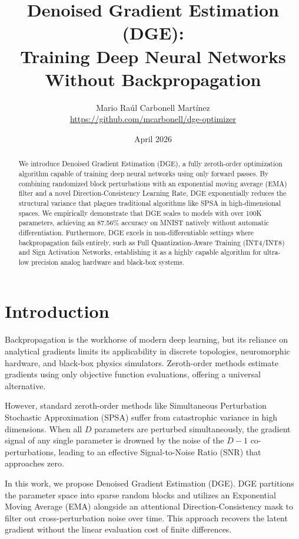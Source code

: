 \documentclass[11pt, a4paper]{article}
\title{Denoised Gradient Estimation (DGE): \\ 
Training Deep Neural Networks Without Backpropagation}
\author{Mario Raúl Carbonell Martínez \\ \url{https://github.com/mcarbonell/dge-optimizer}}
\date{April 2026}
\begin{document}
\maketitle

\begin{abstract}
We introduce Denoised Gradient Estimation (DGE), a fully zeroth-order optimization algorithm capable of training deep neural networks using only forward passes. By combining randomized block perturbations with an exponential moving average (EMA) filter and a novel Direction-Consistency Learning Rate, DGE exponentially reduces the structural variance that plagues traditional algorithms like SPSA in high-dimensional spaces. We empirically demonstrate that DGE scales to models with over 100K parameters, achieving an 87.56\% accuracy on MNIST natively without automatic differentiation. Furthermore, DGE excels in non-differentiable settings where backpropagation fails entirely, such as Full Quantization-Aware Training (INT4/INT8) and Sign Activation Networks, establishing it as a highly capable algorithm for ultra-low precision analog hardware and black-box systems.
\end{abstract}

\section{Introduction}
Backpropagation is the workhorse of modern deep learning, but its reliance on analytical gradients limits its applicability in discrete topologies, neuromorphic hardware, and black-box physics simulators. Zeroth-order methods estimate gradients using only objective function evaluations, offering a universal alternative.

However, standard zeroth-order methods like Simultaneous Perturbation Stochastic Approximation (SPSA) suffer from catastrophic variance in high dimensions. When all $D$ parameters are perturbed simultaneously, the gradient signal of any single parameter is drowned by the noise of the $D-1$ co-perturbations, leading to an effective Signal-to-Noise Ratio (SNR) that approaches zero.

In this work, we propose Denoised Gradient Estimation (DGE). DGE partitions the parameter space into sparse random blocks and utilizes an Exponential Moving Average (EMA) alongside an attentional Direction-Consistency mask to filter out cross-perturbation noise over time. This approach recovers the latent gradient without the linear evaluation cost of finite differences.
\end{document}
